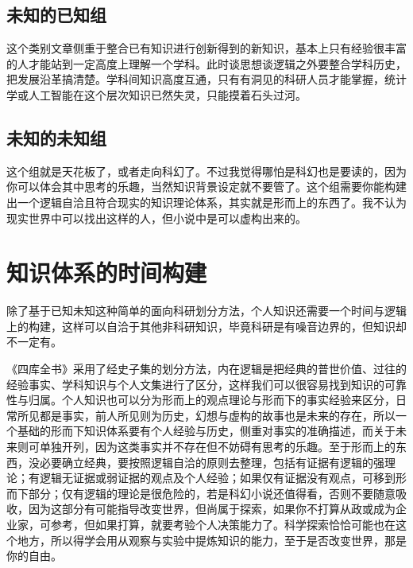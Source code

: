 \documentclass[]{tufte-book}
\begin{document}
\hypertarget{ux672aux77e5ux7684ux5df2ux77e5ux7ec4}{%
\subsection{未知的已知组}\label{ux672aux77e5ux7684ux5df2ux77e5ux7ec4}}

这个类别文章侧重于整合已有知识进行创新得到的新知识，基本上只有经验很丰富的人才能站到一定高度上理解一个学科。此时谈思想谈逻辑之外要整合学科历史，把发展沿革搞清楚。学科间知识高度互通，只有有洞见的科研人员才能掌握，统计学或人工智能在这个层次知识已然失灵，只能摸着石头过河。

\hypertarget{ux672aux77e5ux7684ux672aux77e5ux7ec4}{%
\subsection{未知的未知组}\label{ux672aux77e5ux7684ux672aux77e5ux7ec4}}

这个组就是天花板了，或者走向科幻了。不过我觉得哪怕是科幻也是要读的，因为你可以体会其中思考的乐趣，当然知识背景设定就不要管了。这个组需要你能构建出一个逻辑自洽且符合现实的知识理论体系，其实就是形而上的东西了。我不认为现实世界中可以找出这样的人，但小说中是可以虚构出来的。

\hypertarget{ux77e5ux8bc6ux4f53ux7cfbux7684ux65f6ux95f4ux6784ux5efa}{%
\section{知识体系的时间构建}\label{ux77e5ux8bc6ux4f53ux7cfbux7684ux65f6ux95f4ux6784ux5efa}}

除了基于已知未知这种简单的面向科研划分方法，个人知识还需要一个时间与逻辑上的构建，这样可以自洽于其他非科研知识，毕竟科研是有噪音边界的，但知识却不一定有。

《四库全书》采用了经史子集的划分方法，内在逻辑是把经典的普世价值、过往的经验事实、学科知识与个人文集进行了区分，这样我们可以很容易找到知识的可靠性与归属。个人知识也可以分为形而上的观点理论与形而下的事实经验来区分，日常所见都是事实，前人所见则为历史，幻想与虚构的故事也是未来的存在，所以一个基础的形而下知识体系要有个人经验与历史，侧重对事实的准确描述，而关于未来则可单独开列，因为这类事实并不存在但不妨碍有思考的乐趣。至于形而上的东西，没必要确立经典，要按照逻辑自洽的原则去整理，包括有证据有逻辑的强理论；有逻辑无证据或弱证据的观点及个人经验；如果仅有证据没有观点，可移到形而下部分；仅有逻辑的理论是很危险的，若是科幻小说还值得看，否则不要随意吸收，因为这部分有可能指导改变世界，但尚属于探索，如果你不打算从政或成为企业家，可参考，但如果打算，就要考验个人决策能力了。科学探索恰恰可能也在这个地方，所以得学会用从观察与实验中提炼知识的能力，至于是否改变世界，那是你的自由。
\end{document}

